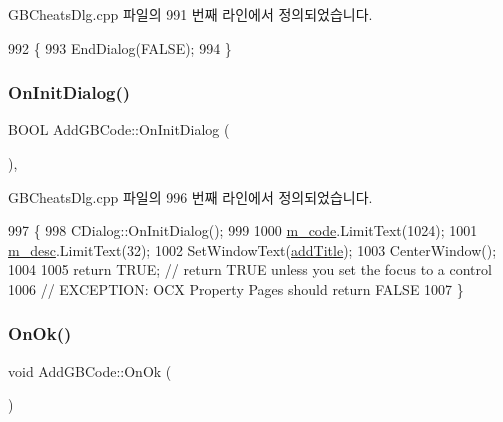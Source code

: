 G\+B\+Cheats\+Dlg.\+cpp 파일의 991 번째 라인에서 정의되었습니다.


\begin{DoxyCode}
992 \{
993   EndDialog(FALSE);
994 \}
\end{DoxyCode}
\mbox{\label{class_add_g_b_code_a1f7ec5a04ded3dee0016552b0961ffba}} 
\subsubsection{\texorpdfstring{On\+Init\+Dialog()}{OnInitDialog()}}
{\footnotesize\ttfamily B\+O\+OL Add\+G\+B\+Code\+::\+On\+Init\+Dialog (\begin{DoxyParamCaption}{ }\end{DoxyParamCaption})\hspace{0.3cm}{\ttfamily [protected]}, {\ttfamily [virtual]}}



G\+B\+Cheats\+Dlg.\+cpp 파일의 996 번째 라인에서 정의되었습니다.


\begin{DoxyCode}
997 \{
998   CDialog::OnInitDialog();
999   
1000   \mbox{\hyperlink{class_add_g_b_code_a1336063b1498bee29c2a9df7273d8ca9}{m\_code}}.LimitText(1024);
1001   \mbox{\hyperlink{class_add_g_b_code_af67488ee0354c39ce9c818e7f389e74f}{m\_desc}}.LimitText(32);
1002   SetWindowText(\mbox{\hyperlink{class_add_g_b_code_a436954b9aea5bac8b7063a6939f829ae}{addTitle}});
1003   CenterWindow();
1004   
1005   \textcolor{keywordflow}{return} TRUE;  \textcolor{comment}{// return TRUE unless you set the focus to a control}
1006                 \textcolor{comment}{// EXCEPTION: OCX Property Pages should return FALSE}
1007 \}
\end{DoxyCode}
\mbox{\label{class_add_g_b_code_ad6bdbbb8375531b30329c5ab4689c052}} 
\subsubsection{\texorpdfstring{On\+Ok()}{OnOk()}}
{\footnotesize\ttfamily void Add\+G\+B\+Code\+::\+On\+Ok (\begin{DoxyParamCaption}{ }\end{DoxyParamCaption})\hspace{0.3cm}{\ttfamily [protected]}}



